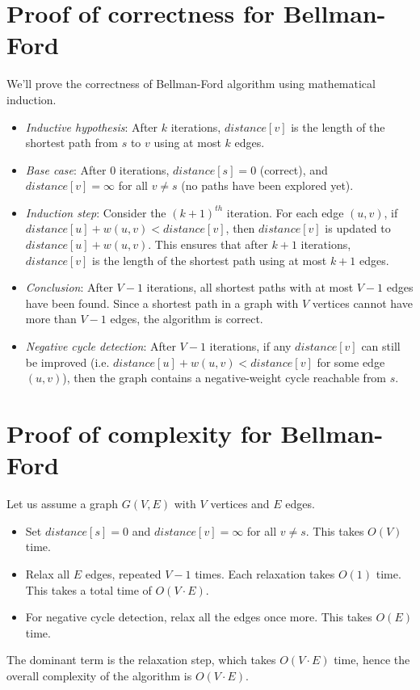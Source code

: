 \begin{appendices}
	\section{Proof of correctness for Bellman-Ford}\label{appendix:bellford:correctness}
	We'll prove the correctness of Bellman-Ford algorithm using mathematical induction.
	\begin{itemize}
		\item \textit{Inductive hypothesis}: After $k$ iterations, $distance[v]$ is the length of the shortest path from $s$ to $v$ using at most $k$ edges.
		\item \textit{Base case}: After 0 iterations, $distance[s]=0$ (correct), and $distance[v] = \infty$ for all $v \neq s$ (no paths have been explored yet).
		\item \textit{Induction step}: Consider the $(k+1)^{th}$ iteration. For each edge $(u,v)$, if $distance[u]+w(u,v)<distance[v]$, then $distance[v]$ is updated to $distance[u]+w(u,v)$. This ensures that after $k+1$ iterations, $distance[v]$ is the length of the shortest path using at most $k+1$ edges.
		\item \textit{Conclusion}: After $V-1$ iterations, all shortest paths with at most $V-1$ edges have been found. Since a shortest path in a graph with $V$ vertices cannot have more than $V-1$ edges, the algorithm is correct.
		\item \textit{Negative cycle detection}: After $V - 1$ iterations, if any $distance[v]$ can still be improved (i.e. $distance[u]+w(u,v)<distance[v]$ for some edge $(u,v)$), then the graph contains a negative-weight cycle reachable from $s$.
	\end{itemize}
	\section{Proof of complexity for Bellman-Ford}\label{appendix:bellford:complexity}
	Let us assume a graph $G(V, E)$ with $V$ vertices and $E$ edges.
	\begin{itemize}
		\item Set $distance[s]=0$ and $distance[v]=\infty$ for all $v \neq s$. This takes $O(V)$ time.
		\item Relax all $E$ edges, repeated $V - 1$ times. Each relaxation takes $O(1)$ time. This takes a total time of $O(V \cdot E)$.
		\item For negative cycle detection, relax all the edges once more. This takes $O(E)$ time.
	\end{itemize}
	The dominant term is the relaxation step, which takes $O(V \cdot E)$ time, hence the overall complexity of the algorithm is $O(V \cdot E)$.

\end{appendices}
